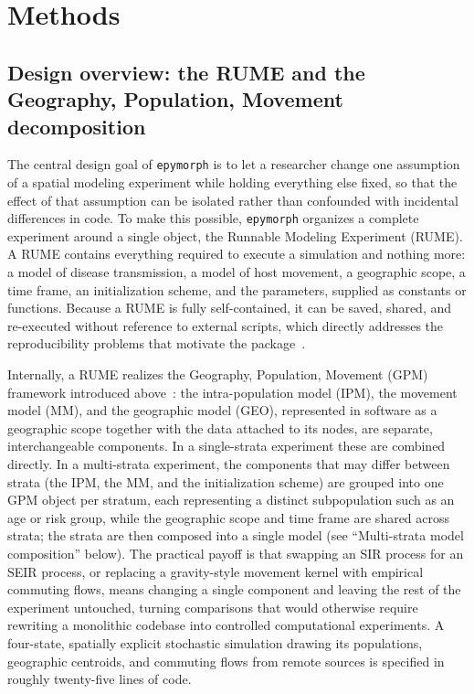 
\section{Methods}\label{sec:methods}

\subsection{Design overview: the RUME and the Geography, Population, Movement decomposition}

The central design goal of \texttt{epymorph} is to let a researcher change one assumption of
a spatial modeling experiment while holding everything else fixed, so that the effect of
that assumption can be isolated rather than confounded with incidental differences in code.
To make this possible, \texttt{epymorph} organizes a complete experiment around a single
object, the Runnable Modeling Experiment (RUME). A RUME contains everything required to
execute a simulation and nothing more: a model of disease transmission, a model of host
movement, a geographic scope, a time frame, an initialization scheme, and the parameters,
supplied as constants or functions. Because a RUME is fully self-contained, it can be saved,
shared, and re-executed without reference to external scripts, which directly addresses the
reproducibility problems that motivate the package~\citep{oshinubi_systematic_2026}.

Internally, a RUME realizes the Geography, Population, Movement (GPM) framework introduced
above~\citep{oshinubi_systematic_2026}: the intra-population model (IPM), the movement model (MM), and the geographic
model (GEO), represented in software as a geographic scope together with the data attached
to its nodes, are separate, interchangeable components. In a single-strata experiment these
are combined directly. In a multi-strata experiment, the components that may differ between
strata (the IPM, the MM, and the initialization scheme) are grouped into one GPM object per
stratum, each representing a distinct subpopulation such as an age or risk group, while the
geographic scope and time frame are shared across strata; the strata are then composed into
a single model (see ``Multi-strata model composition'' below). The practical payoff is that
swapping an SIR process for an SEIR process, or replacing a gravity-style movement kernel
with empirical commuting flows, means changing a single component and leaving the rest of
the experiment untouched, turning comparisons that would otherwise require rewriting a
monolithic codebase into controlled computational experiments. A four-state, spatially
explicit stochastic simulation drawing its populations, geographic centroids, and commuting
flows from remote sources is specified in roughly twenty-five lines of code.

